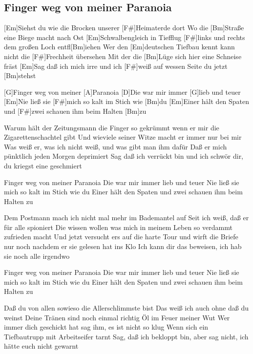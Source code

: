 \subsection*{Finger weg von meiner Paranoia   }

\begin{guitar}

[Em]Siehst du wie die Brocken unserer [F#]Heimaterde dort
Wo die [Bm]Straße eine Biege macht nach Ost
[Em]Schwalbengleich in Tiefflug
[F#]links und rechts dem großen Loch entfl[Bm]iehen
Wer den [Em]deutschen Tiefbau kennt
kann nicht die [F#]Frechheit übersehen
Mit der die [Bm]Lüge sich hier eine Schneise fräst
[Em]Sag daß ich mich irre und ich [F#]weiß auf wessen
Seite du jetzt [Bm]stehst



[G]Finger weg von meiner [A]Paranoia
[D]Die war mir immer [G]lieb und teuer
[Em]Nie ließ sie [F#]mich so kalt im Stich wie [Bm]du
[Em]Einer hält den Spaten und [F#]zwei schauen ihm beim Halten [Bm]zu



Warum hält der Zeitungsmann die Finger so gekrümmt
wenn er mir die Zigarettenschachtel gibt
Und wieviele seiner Witze
macht er immer nur bei mir
Was weiß er, was ich nicht weiß,
und was gibt man ihm dafür
Daß er mich pünktlich jeden Morgen deprimiert
Sag daß ich verrückt bin und ich schwör dir,
du kriegst eine geschmiert

Finger weg von meiner Paranoia
Die war mir immer lieb und teuer
Nie ließ sie mich so kalt im Stich wie du
Einer hält den Spaten und zwei schauen ihm
beim Halten zu


Dem Postmann mach ich nicht mal mehr im Bademantel auf
Seit ich weiß, daß er für alle spioniert
Die wissen wollen was mich in meinem Leben
so verdammt zufrieden macht
Und jetzt versucht ers auf die harte Tour
und wirft die Briefe nur noch
nachdem er sie gelesen hat ins Klo
Ich kann dir das beweisen, ich hab sie noch
alle irgendwo

Finger weg von meiner Paranoia
Die war mir immer lieb und teuer
Nie ließ sie mich so kalt im Stich wie du
Einer hält den Spaten und zwei schauen ihm
beim Halten zu


Daß du von allen sowieso die Allerschlimmste bist
Das weiß ich auch ohne daß du weinst
Deine Tränen sind noch einmal richtig
Öl im Feuer meiner Wut
Wer immer dich geschickt hat
sag ihm, es ist nicht so klug
Wenn sich ein Tiefbautrupp mit Arbeitseifer tarnt
Sag, daß ich bekloppt bin, aber sag nicht,
ich hätte euch nicht gewarnt
\end{guitar}

